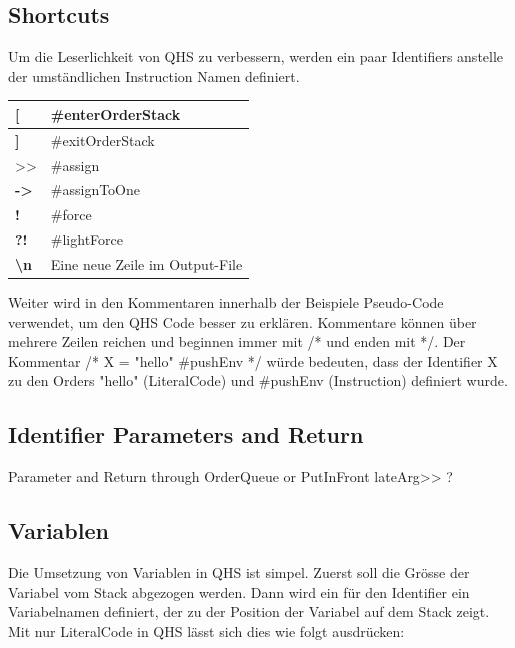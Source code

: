 \subsection{Shortcuts}
Um die Leserlichkeit von QHS zu verbessern, werden ein paar Identifiers anstelle der umständlichen Instruction Namen definiert.

\begin{table}[H]
    \centering
    \begin{tabular}{l|l}
    \textbf{{[}}                 & \#enterOrderStack              \\ \hline
    \textbf{{]}}                 & \#exitOrderStack               \\ \hline
    \textgreater{}\textgreater{} & \#assign                       \\ \hline
    \textbf{-\textgreater{}}     & \#assignToOne                  \\ \hline
    \textbf{!}                   & \#force                        \\ \hline
    \textbf{?!}                  & \#lightForce                   \\ \hline
    \textbf{\textbackslash{}n}   & Eine neue Zeile im Output-File
    \end{tabular}
\end{table}

Weiter wird in den Kommentaren innerhalb der Beispiele Pseudo-Code verwendet, um den QHS Code besser zu erklären. Kommentare können über mehrere Zeilen reichen und beginnen immer mit /* und enden mit */.
Der Kommentar /* X = "hello" \#pushEnv */ würde bedeuten, dass der Identifier X zu den Orders "hello" (LiteralCode) und \#pushEnv (Instruction) definiert wurde. 

\subsection{Identifier Parameters and Return}
Parameter and Return through OrderQueue or PutInFront
lateArg>> ?

\subsection{Variablen} \label{sec:qhs-vars}
Die Umsetzung von Variablen in QHS ist simpel. Zuerst soll die Grösse der Variabel vom Stack abgezogen werden. Dann wird ein für den Identifier ein Variabelnamen definiert, der zu der Position der Variabel auf dem Stack zeigt.
Mit nur LiteralCode in QHS lässt sich dies wie folgt ausdrücken:

